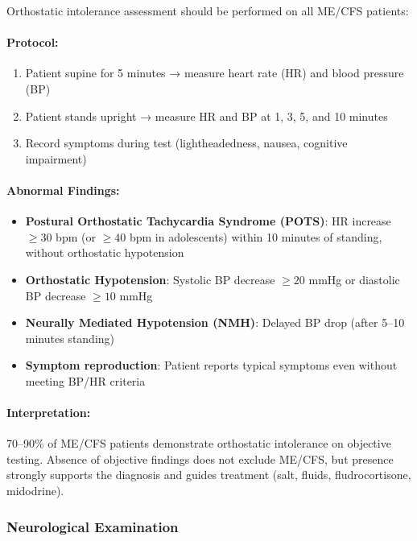 \begin{requirement}
\label{req:orthostatic-testing}
Orthostatic intolerance assessment should be performed on all ME/CFS patients:

\paragraph{Protocol:}
\begin{enumerate}
    \item Patient supine for 5 minutes → measure heart rate (HR) and blood pressure (BP)
    \item Patient stands upright → measure HR and BP at 1, 3, 5, and 10 minutes
    \item Record symptoms during test (lightheadedness, nausea, cognitive impairment)
\end{enumerate}

\paragraph{Abnormal Findings:}
\begin{itemize}
    \item \textbf{Postural Orthostatic Tachycardia Syndrome (POTS)}: HR increase $\geq 30$ bpm (or $\geq 40$ bpm in adolescents) within 10 minutes of standing, without orthostatic hypotension
    \item \textbf{Orthostatic Hypotension}: Systolic BP decrease $\geq 20$ mmHg or diastolic BP decrease $\geq 10$ mmHg
    \item \textbf{Neurally Mediated Hypotension (NMH)}: Delayed BP drop (after 5--10 minutes standing)
    \item \textbf{Symptom reproduction}: Patient reports typical symptoms even without meeting BP/HR criteria
\end{itemize}

\paragraph{Interpretation:}
70--90\% of ME/CFS patients demonstrate orthostatic intolerance on objective testing. Absence of objective findings does not exclude ME/CFS, but presence strongly supports the diagnosis and guides treatment (salt, fluids, fludrocortisone, midodrine).
\end{requirement}

\subsubsection{Neurological Examination}

